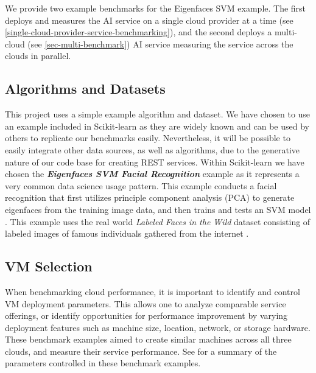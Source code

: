 We provide two example benchmarks for the Eigenfaces SVM example. The
first deploys and measures the AI service on a single cloud provider at
a time (see \ref{single-cloud-provider-service-benchmarking}), and the second deploys a multi-cloud (see \ref{sec-multi-benchmark}) AI service measuring the service across the clouds in parallel.


\subsection{Algorithms and Datasets}
\label{sec:algorithms-and-datasets}

This project uses a simple example algorithm and dataset. We have chosen to use an example included in Scikit-learn as they are
widely known and can be used by others to replicate our benchmarks
easily. Nevertheless, it will be possible to easily integrate other data
sources, as well as algorithms, due to the generative nature of our code base for creating REST services. Within Scikit-learn we have chosen the {\bf\em Eigenfaces SVM Facial Recognition} example as it represents a very common data science usage pattern. This example conducts a facial recognition
that first utilizes principle component analysis (PCA) to
generate eigenfaces from the training image data, and then trains and
tests an SVM model \cite{www-skikit-learn-faces}. This example uses the real world {\em Labeled Faces in the Wild} dataset
consisting of labeled images of famous individuals gathered from the
internet \cite{faces-data}.




\subsection{VM Selection}\label{vm-selection}

When benchmarking cloud performance, it is important to identify and
control VM deployment parameters. This allows one to analyze comparable service offerings, or identify
opportunities for performance improvement by varying deployment features
such as machine size, location, network, or storage hardware. These
benchmark examples aimed to create similar machines across all three clouds, and
measure their service performance. See  for a summary of the parameters
controlled in these benchmark examples.

